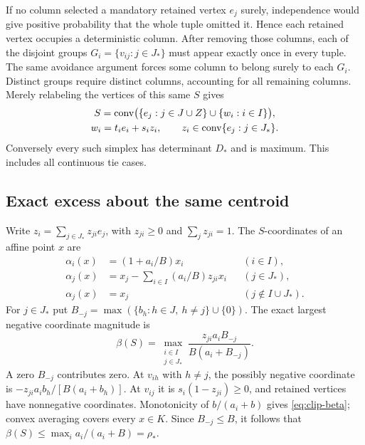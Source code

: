 If no column selected a mandatory retained vertex $e_j$ surely,
independence would give positive probability that the whole tuple omitted
it. Hence each retained vertex occupies a deterministic column. After
removing those columns, each of the disjoint groups
$G_i=\{v_{ij}:j\in J_*\}$ must appear exactly once in every tuple.
The same avoidance argument forces some column to belong surely to each
$G_i$. Distinct groups require distinct columns, accounting for all
remaining columns. Merely relabeling the vertices of this same $S$ gives
\begin{equation}\label{eq:all-maxima}
 \begin{gathered}
 S=\operatorname{conv}\bigl(\{e_j:j\in J\cup Z\}\cup\{w_i:i\in I\}\bigr),\\
 w_i=t_ie_i+s_iz_i,\qquad z_i\in\operatorname{conv}\{e_j:j\in J_*\}.
 \end{gathered}
\end{equation}
Conversely every such simplex has determinant $D_*$ and is maximum.
This includes all continuous tie cases.

\subsection{Exact excess about the same centroid}
Write $z_i=\sum_{j\in J_*}z_{ji}e_j$, with $z_{ji}\ge0$ and
$\sum_jz_{ji}=1$. The $S$-coordinates of an affine point $x$ are
\begin{equation}\label{eq:clip-inverse}
 \begin{aligned}
 \alpha_i(x)&=(1+a_i/B)x_i &&(i\in I),\\
 \alpha_j(x)&=x_j-\sum_{i\in I}(a_i/B)z_{ji}x_i &&(j\in J_*),\\
 \alpha_j(x)&=x_j &&(j\notin I\cup J_*).
 \end{aligned}
\end{equation}
For $j\in J_*$ put $B_{-j}=\max(\{b_h:h\in J,\ h\ne j\}\cup\{0\})$.
The exact largest negative coordinate magnitude is
\begin{equation}\label{eq:clip-beta}
 \beta(S)=\max_{\substack{i\in I\\j\in J_*}}
       \frac{z_{ji}a_iB_{-j}}{B(a_i+B_{-j})}.
\end{equation}
A zero $B_{-j}$ contributes zero. At $v_{ih}$ with $h\ne j$, the possibly
negative coordinate is $-z_{ji}a_ib_h/[B(a_i+b_h)]$. At $v_{ij}$ it is
$s_i(1-z_{ji})\ge0$, and retained vertices have nonnegative coordinates.
Monotonicity of $b/(a_i+b)$ gives \eqref{eq:clip-beta}; convex averaging
covers every $x\in K$. Since $B_{-j}\le B$, it follows that
$\beta(S)\le\max_i a_i/(a_i+B)=\rho_*$.

